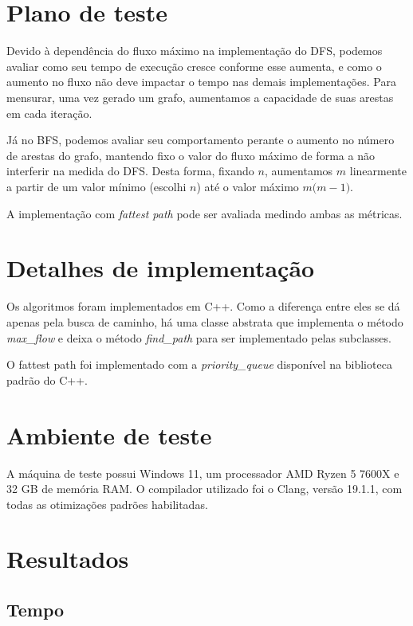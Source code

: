 \documentclass[11pt]{article}
\begin{document}
\section{Plano de teste}

Devido à dependência do fluxo máximo na implementação do DFS, podemos avaliar como seu tempo de execução cresce conforme esse aumenta, e como o aumento no fluxo não deve impactar o tempo nas demais implementações. Para mensurar, uma vez gerado um grafo, aumentamos a capacidade de suas arestas em cada iteração.

Já no BFS, podemos avaliar seu comportamento perante o aumento no número de arestas do grafo, mantendo fixo o valor do fluxo máximo de forma a não interferir na medida do DFS. Desta forma, fixando $n$, aumentamos $m$ linearmente a partir de um valor mínimo (escolhi $n$) até o valor máximo $m \dot (m - 1)$.

A implementação com \textit{fattest path} pode ser avaliada medindo ambas as métricas.

\section{Detalhes de implementação}

Os algoritmos foram implementados em C++. Como a diferença entre eles se dá apenas pela busca de caminho, há uma classe abstrata que implementa o método \textit{max\_flow} e deixa o método \textit{find\_path} para ser implementado pelas subclasses.

O fattest path foi implementado com a \textit{priority\_queue} disponível na biblioteca padrão do C++.

\section{Ambiente de teste}

A máquina de teste possui Windows 11, um processador AMD Ryzen 5 7600X e 32 GB de memória RAM. O compilador utilizado foi o Clang, versão 19.1.1, com todas as otimizações padrões habilitadas.

\section{Resultados}

\subsection{Tempo}
\end{document}
